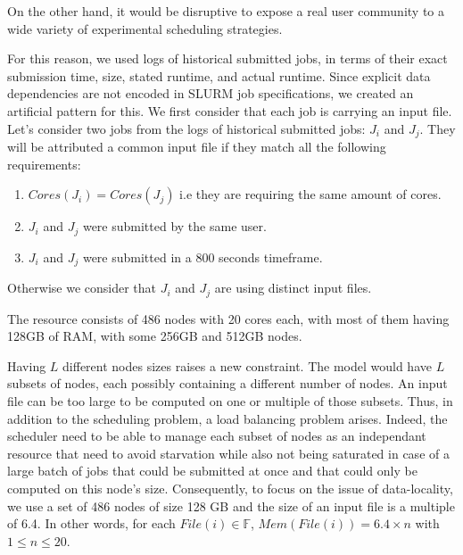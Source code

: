 \documentclass[conference,10pt]{IEEEtran}
\newcommand{\file}{\ensuremath{\mathit{File}}\xspace}
\newcommand{\memory}{\ensuremath{\mathit{Mem}}\xspace}
\newcommand{\core}{\mathit{Cores}\xspace}
\newcommand{\fileset}{\ensuremath{\mathbb{F}}\xspace}
\begin{document}
On the other hand, it would be disruptive to expose a real user community to a wide variety of experimental scheduling strategies.

For this reason, we used logs of historical submitted jobs, in terms of their exact submission time, size, stated runtime, and actual runtime.
Since explicit data dependencies are not encoded in SLURM job specifications, we created an artificial pattern for this. 
We first consider that each job is carrying an input file.
Let's consider two jobs from the logs of historical submitted jobs: $J_i$ and $J_j$.
They will be attributed a common input file if they match all the following requirements:
\begin{enumerate}
	\item $\core(J_i) = \core(J_j)$ i.e they are requiring the same amount of cores.
	\item $J_i$ and $J_j$ were submitted by the same user.
	\item $J_i$ and $J_j$ were submitted in a 800 seconds timeframe.
\end{enumerate}
Otherwise we consider that $J_i$ and $J_j$ are using distinct input files.

The resource consists of 486 nodes with 20 cores each, with most of them having 128GB of RAM, with some 256GB and 512GB nodes. 

Having $L$ different nodes sizes raises a new constraint. The model would have
$L$ subsets of nodes, each possibly containing a different number of nodes.
An input file can be too large to be computed on one or multiple of those subsets.
Thus, in addition to the scheduling problem, a load balancing problem arises.
Indeed, the scheduler need to be able to manage each subset of nodes as an independant 
resource that need to avoid starvation while also not being saturated in case of a large
batch of jobs that could be submitted at once and that could only be computed on this node's size.
Consequently, to focus on the issue of data-locality, we use a set of 486 nodes of size 
128 GB and the size of an input file is a multiple of 6.4.
In other words, for each $\file(i) \in \fileset$, $\memory(\file(i)) = 6.4 \times n$ with 
$1 \leq n \leq 20$.
\end{document}
